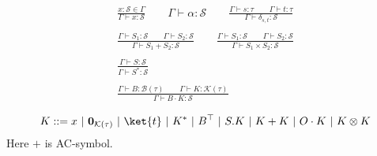 \begin{definition}
\begin{definition}
  \begin{gather*}
    \frac{x : \mathcal{S} \in \Gamma}{\Gamma \vdash x : \mathcal{S}}
    \qquad 
    \Gamma \vdash \alpha : \mathcal{S}
    \qquad
    \frac{\Gamma \vdash s : \tau \qquad \Gamma \vdash t : \tau}{\Gamma \vdash \delta_{s, t} : \mathcal{S}} \\
    \\
    \frac{\Gamma \vdash S_1 : \mathcal{S} \qquad \Gamma \vdash S_2 : \mathcal{S}}{\Gamma \vdash S_1 + S_2 : \mathcal{S}}
    \qquad
    \frac{\Gamma \vdash S_1 : \mathcal{S} \qquad \Gamma \vdash S_2 : \mathcal{S}}{\Gamma \vdash S_1 \times S_2 : \mathcal{S}} \\
    \\
    \frac{\Gamma \vdash S : \mathcal{S}}{\Gamma \vdash S^* : \mathcal{S}} \\
    \\
    \frac{\Gamma \vdash B : \mathcal{B}(\tau) \qquad \Gamma \vdash K : \mathcal{K}(\tau)}{\Gamma \vdash B \cdot K : \mathcal{S}}
  \end{gather*}
\end{definition}


\begin{definition}
  \begin{align*}
    K ::= x\ |\ \zeroK{\tau}\ |\ \ket{t}\ |\ K^*\ |\ B^\top\ |\ S.K\ |\ K + K\ |\ O \cdot K\ |\ K \otimes K
  \end{align*}
  Here $+$ is AC-symbol.
\end{definition}



\end{definition}
